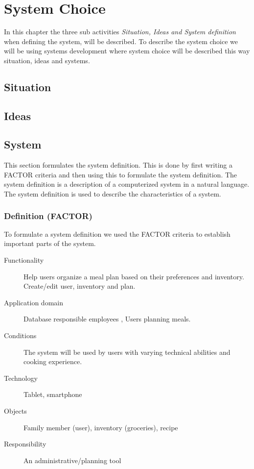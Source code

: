 \chapter{System Choice}
In this chapter the three sub activities \textit{Situation, Ideas and System definition} when defining the system, will be described. To describe the system choice we will be using systems development where system choice will be described this way situation, ideas and systems.

\section{Situation} \label{SituationLabel}


\section{Ideas} \label{IdeasLabel}


\section{System}
This section formulates the system definition. This is done by first writing a FACTOR criteria and then using this to formulate the system definition. The system definition is a description of a computerized system in a natural language. The system definition is used to describe the characteristics of a system.
\subsection{Definition (FACTOR)}
To formulate a system definition we used the FACTOR \cite{OOAD_BATOF} criteria to establish important parts of the system.

\begin{description}
	\item[Functionality] Help users organize a meal plan based on their preferences and inventory. Create/edit user, inventory and plan.
	\item[Application domain] Database responsible employees , Users planning meals.
	\item[Conditions] The system will be used by users with varying technical abilities and cooking experience.
	\item[Technology] Tablet, smartphone
	\item[Objects] Family member (user), inventory (groceries), recipe
	\item[Responsibility] An administrative/planning tool
\end{description}

